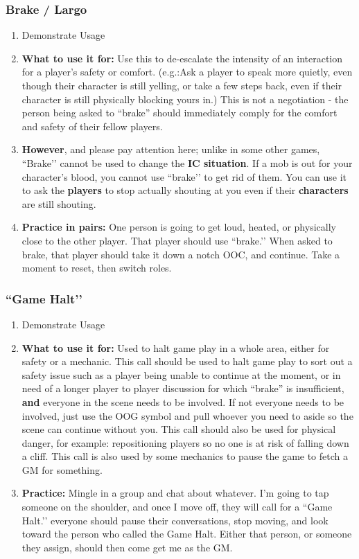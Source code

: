 \documentclass[green]{GL2020}
\begin{document}
\subsubsection*{Brake / Largo}
	\begin{enumerate}
		\item Demonstrate Usage
		\item \textbf{What to use it for:} Use this to de-escalate the intensity of an interaction for a player’s safety or comfort. (e.g.:Ask a player to speak more quietly, even though their character is still yelling, or take a few steps back, even if their character is still physically blocking yours in.) This is not a negotiation - the person being asked to ``brake'' should immediately comply for the comfort and safety of their fellow players.
		\item \textbf{However}, and please pay attention here; unlike in some other games, ``Brake’’ cannot be used to change the \textbf{IC situation}. If a mob is out for your character’s blood, you cannot use ``brake’’ to get rid of them. You can use it to ask the \textbf{players} to stop actually shouting at you even if their \textbf{characters} are still shouting.
		\item \textbf{Practice in pairs:} One person is going to get loud, heated, or physically close to the other player. That player should use ``brake.’’ When asked to brake, that player should take it down a notch OOC, and continue. Take a moment to reset, then switch roles.
\end{enumerate}

\subsubsection*{``Game Halt’’}
	\begin{enumerate}
		\item Demonstrate Usage
		\item \textbf{What to use it for:} Used to halt game play in a whole area, either for safety or a mechanic. This call should be used to halt game play to sort out a safety issue such as a player being unable to continue at the moment, or in need of a longer player to player discussion for which ``brake'' is insufficient, \textbf{and} everyone in the scene needs to be involved. If not everyone needs to be involved, just use the OOG symbol and pull whoever you need to aside so the scene can continue without you. This call should also be used for physical danger, for example: repositioning players so no one is at risk of falling down a cliff. This call is also used by some mechanics to pause the game to fetch a GM for something.
		\item \textbf{Practice:} Mingle in a group and chat about whatever. I’m going to tap someone on the shoulder, and once I move off, they will call for a ``Game Halt.’’ everyone should pause their conversations, stop moving, and look toward the person who called the Game Halt. Either that person, or someone they assign, should then come get me as the GM.
	\end{enumerate}
	
\end{document}
